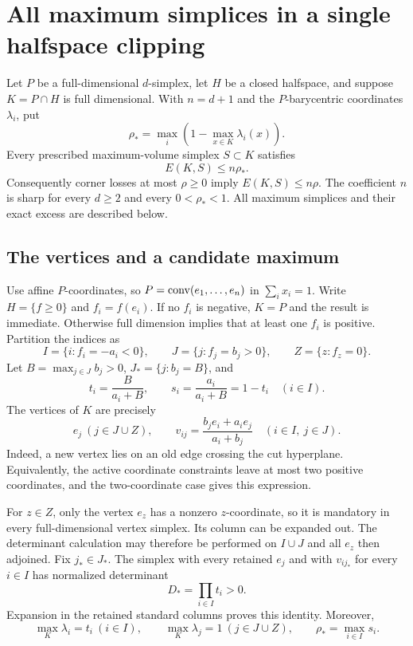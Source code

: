\section{All maximum simplices in a single halfspace clipping}\label{sec:clipping}
\begin{theorem}\label{thm:clipping}
Let $P$ be a full-dimensional $d$-simplex, let $H$ be a closed halfspace,
and suppose $K=P\cap H$ is full dimensional. With $n=d+1$ and the
$P$-barycentric coordinates $\lambda_i$, put
\[
 \rho_* =\max_i\left(1-\max_{x\in K}\lambda_i(x)\right).
\]
Every prescribed maximum-volume simplex $S\subset K$ satisfies
\begin{equation}\label{eq:clip-bound}
 E(K,S)\le n\rho_*.
\end{equation}
Consequently corner losses at most $\rho\ge0$ imply $E(K,S)\le n\rho$.
The coefficient $n$ is sharp for every $d\ge2$ and every $0<\rho_*<1$.
All maximum simplices and their exact excess are described below.
\end{theorem}

\subsection{The vertices and a candidate maximum}
Use affine $P$-coordinates, so $P=\operatorname{conv}(e_1,\ldots,e_n)$ in
$\sum_i x_i=1$. Write $H=\{f\ge0\}$ and $f_i=f(e_i)$. If no $f_i$ is
negative, $K=P$ and the result is immediate. Otherwise full dimension
implies that at least one $f_i$ is positive. Partition the indices as
\[
 I=\{i:f_i=-a_i<0\},\qquad J=\{j:f_j=b_j>0\},\qquad Z=\{z:f_z=0\}.
\]
Let $B=\max_{j\in J}b_j>0$, $J_* =\{j:b_j=B\}$, and
\[
 t_i=\frac B{a_i+B},\qquad s_i=\frac{a_i}{a_i+B}=1-t_i\quad(i\in I).
\]
The vertices of $K$ are precisely
\begin{equation}\label{eq:clip-vertices}
 e_j\ (j\in J\cup Z),\qquad
 v_{ij}=\frac{b_je_i+a_ie_j}{a_i+b_j}\quad(i\in I,\ j\in J).
\end{equation}
Indeed, a new vertex lies on an old edge crossing the cut hyperplane.
Equivalently, the active coordinate constraints leave at most two positive
coordinates, and the two-coordinate case gives this expression.

For $z\in Z$, only the vertex $e_z$ has a nonzero $z$-coordinate, so it
is mandatory in every full-dimensional vertex simplex. Its column can be
expanded out. The determinant calculation may therefore be performed on
$I\cup J$ and all $e_z$ then adjoined. Fix $j_*\in J_*$. The simplex
with every retained $e_j$ and with $v_{i j_*}$ for every $i\in I$ has
normalized determinant
\begin{equation}\label{eq:clip-D}
 D_* =\prod_{i\in I}t_i>0.
\end{equation}
Expansion in the retained standard columns proves this identity. Moreover,
\begin{equation}\label{eq:clip-loss}
 \max_K\lambda_i=t_i\ (i\in I),\qquad
 \max_K\lambda_j=1\ (j\in J\cup Z),\qquad
 \rho_* =\max_{i\in I}s_i.
\end{equation}

